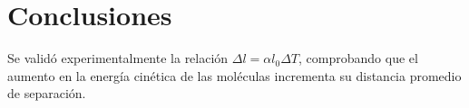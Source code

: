 \section*{Conclusiones}
Se validó experimentalmente la relación $\Delta l = \alpha l_0 \Delta T$, comprobando que el aumento en la energía cinética de las moléculas incrementa su distancia promedio de separación.
